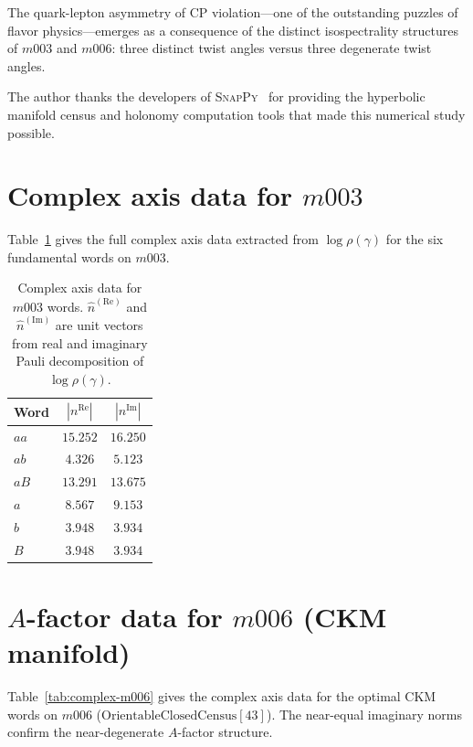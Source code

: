 ﻿\documentclass[epjc3]{svjour3}
\begin{document}
The quark-lepton asymmetry of CP violation---one of the outstanding
puzzles of flavor physics---emerges as a consequence of the distinct
isospectrality structures of $m003$ and $m006$: three distinct twist
angles versus three degenerate twist angles.

\begin{acknowledgements}
The author thanks the developers of
\textsc{SnapPy}~\cite{Culler2023} for providing the hyperbolic
manifold census and holonomy computation tools that made this
numerical study possible.
\end{acknowledgements}

\appendix

\section{Complex axis data for $m003$}
\label{app:complexdata}

Table~\ref{tab:complex-m003} gives the full complex axis data
extracted from $\log\rho(\gamma)$ for the six fundamental words on
$m003$.

\begin{table}[ht]
\caption{Complex axis data for $m003$ words.  $\hat{n}^{(\mathrm{Re})}$
  and $\hat{n}^{(\mathrm{Im})}$ are unit vectors from real and
  imaginary Pauli decomposition of $\log\rho(\gamma)$.}
\label{tab:complex-m003}
\centering
\begin{tabular}{lcc}
\toprule
Word & $|n^{\mathrm{Re}}|$ & $|n^{\mathrm{Im}}|$ \\
\midrule
$aa$ & $15.252$ & $16.250$ \\
$ab$ & $4.326$  & $5.123$  \\
$aB$ & $13.291$ & $13.675$ \\
$a$  & $8.567$  & $9.153$  \\
$b$  & $3.948$  & $3.934$  \\
$B$  & $3.948$  & $3.934$  \\
\bottomrule
\end{tabular}
\end{table}

\section{$A$-factor data for $m006$ (CKM manifold)}
\label{app:m006data}

Table~\ref{tab:complex-m006} gives the complex axis data for the
optimal CKM words on $m006$
($\mathrm{OrientableClosedCensus}[43]$).  The near-equal imaginary
norms confirm the near-degenerate $A$-factor structure.
\end{document}
